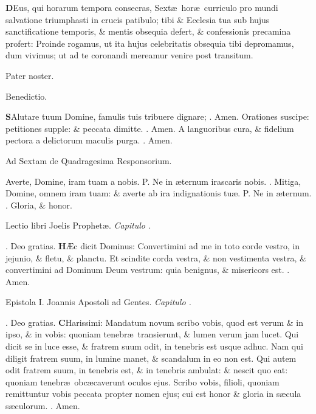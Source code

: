 \documentclass[letter,11pt]{book}
\makeatletter
\DeclareRobustCommand{\Vbar}{\vers@resp{-0.1em}{V}}
\DeclareRobustCommand{\Rbar}{\vers@resp{0pt}{R}}
\newcommand{\vers@resp@sym}{\raisebox{0.2ex}{\rotatebox[origin=c]{-20}{$\m@th\rceil$}}}
\newcommand{\vers@resp}[2]{%
  {\ooalign{\hidewidth\kern#1\vers@resp@sym\hidewidth\cr#2\cr}}%
}%
\def\P{\color{Red} P. \color{black}}
\def\V{\color{Red} \Vbar . \color{black}}
\def\R{\color{Red} \Rbar . \color{black}}
\makeatother
\begin{document}
\begin{multicols*}{2}
\lettrine[lines=2]{\bfseries \color{Red} D}{}Eus, qui horarum tempora consecras, Sext\ae \ hor\ae \ curriculo pro mundi salvatione triumphasti in crucis patibulo; tibi \& Ecclesia tua sub hujus sanctificatione temporis, \& mentis obsequia defert, \& confessionis precamina profert: Proinde rogamus, ut ita hujus celebritatis obsequia tibi depromamus, dum vivimus; ut ad te coronandi mereamur venire post transitum.
\par Pater noster.
\vspace{-.5em} \begin{center} \color{Red} Benedictio. \end{center} \vspace{-.5em}
\lettrine[lines=2]{\bfseries \color{Red} S}{}Alutare tuum Domine, famulis tuis tribuere dignare; \R Amen. Orationes suscipe: petitiones supple: \& peccata dimitte. \R Amen. A languoribus cura, \& fidelium pectora a delictorum maculis purga. \R Amen.
\vspace{-.5em} \begin{center} \color{Red} Ad Sextam de Quadragesima Responsorium. \end{center} \vspace{-.5em}
\par \noindent Averte, Domine, iram tuam a nobis. \P Ne in \ae ternum irascaris nobis. \V Mitiga, Domine, omnem iram tuam: \& averte ab ira indignationis tu\ae . \P Ne in \ae ternum. \V Gloria, \& honor.
\vspace{-.5em} \begin{center} {\color{Red} L}ectio libri Joelis Prophet\ae . \itshape Capitulo . \end{center} \vspace{-.5em}
\par \noindent \R Deo gratias.
\lettrine[lines=2]{\bfseries \color{Red} H}{}\AE c dicit Dominus: Convertimini ad me in toto corde vestro, in jejunio, \& fletu, \& planctu. Et scindite corda vestra, \& non vestimenta vestra, \& convertimini ad Dominum Deum vestrum: quia benignus, \& misericors est. \R Amen.
\vspace{-.5em} \begin{center} {\color{Red} E}pistola I. Joannis Apostoli ad Gentes. \itshape Capitulo . \end{center} \vspace{-.5em}
\par \noindent \R Deo gratias.
\lettrine[lines=2]{\bfseries \color{Red} C}{}Harissimi: Mandatum novum scribo vobis, quod est verum \& in ipso, \& in vobis: quoniam tenebr\ae \ transierunt, \& lumen verum jam lucet. Qui dicit se in luce esse, \& fratrem suum odit, in tenebris est usque adhuc. Nam qui diligit fratrem suum, in lumine manet, \& scandalum in eo non est. Qui autem odit fratrem suum, in tenebris est, \& in tenebris ambulat: \& nescit quo eat: quoniam tenebr\ae \ obc\ae caverunt oculos ejus. Scribo vobis, filioli, quoniam remittuntur vobis peccata propter nomen ejus; cui est honor \& gloria in s\ae cula s\ae culorum. \R Amen.

\end{multicols*}
\end{document}
